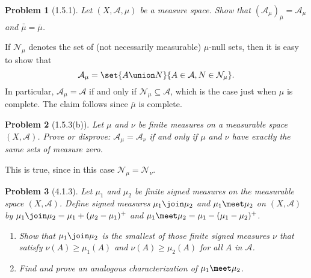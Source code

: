 \documentclass[a4paper, 11pt]{memoir}
\theoremstyle{plaincustomnumber}
\newtheorem{problem}{Problem}
\theoremstyle{changedotbreakcustomnumber}
\newcommand{\calN}{\mathcal{N}}
\newcommand{\calA}{\mathcal{A}}
\begin{document}
\begin{problem}[1.5.1]
    Let $(X,\calA,\mu)$ be a measure space. Show that $(\calA_\mu)_{\overline{\mu}} = \calA_\mu$ and $\overline{\overline{\mu}} = \overline{\mu}$.
\end{problem}

\begin{solution}
    If $\calN_\mu$ denotes the set of (not necessarily measurable) $\mu$-null sets, then it is easy to show that
    \begin{equation*}
        \calA_\mu
            = \set{A \union N}{A \in \calA, N \in \calN_\mu}.
    \end{equation*}
    In particular, $\calA_\mu = \calA$ if and only if $\calN_\mu \subseteq \calA$, which is the case just when $\mu$ is complete. The claim follows since $\overline{\mu}$ is complete.
\end{solution}


\begin{problem}[1.5.3(b)]
    Let $\mu$ and $\nu$ be finite measures on a measurable space $(X,\calA)$. Prove or disprove: $\calA_\mu = \calA_\nu$ if and only if $\mu$ and $\nu$ have exactly the same sets of measure zero.
\end{problem}

\begin{solution}
    This is true, since in this case $\calN_\mu = \calN_\nu$.
\end{solution}


\begin{problem}[4.1.3]
    Let $\mu_1$ and $\mu_2$ be finite signed measures on the measurable space $(X,\calA)$. Define signed measures $\mu_1 \join \mu_2$ and $\mu_1 \meet \mu_2$ on $(X,\calA)$ by $\mu_1 \join \mu_2 = \mu_1 + (\mu_2 - \mu_1)^+$ and $\mu_1 \meet \mu_2 = \mu_1 - (\mu_1 - \mu_2)^+$.
    \begin{enumerate}
        \item Show that $\mu_1 \join \mu_2$ is the smallest of those finite signed measures $\nu$ that satisfy
        $\nu(A) \geq \mu_1(A)$ and $\nu(A) \geq \mu_2(A)$ for all $A$ in $\calA$.
        
        \item Find and prove an analogous characterization of $\mu_1 \meet \mu_2$.
    \end{enumerate}
\end{problem}
\end{document}
